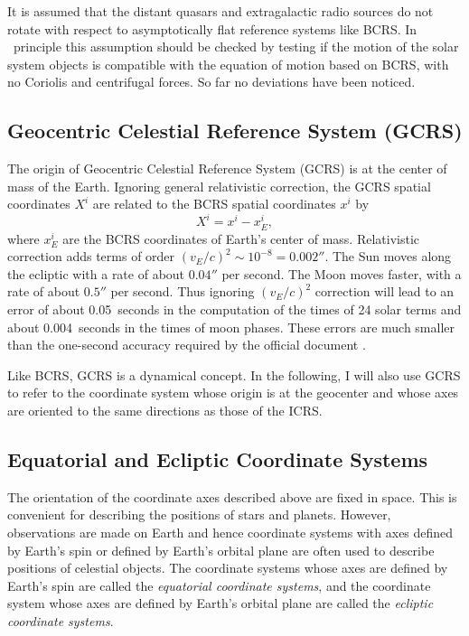 \documentclass[12pt]{article}
\newcommand \beq {\begin{equation}}
\newcommand \eeq {\end{equation}}
\begin{document}
\begin{CJK}{UTF8}{bkai}
It is assumed that the distant quasars and extragalactic radio sources do not 
rotate with respect to asymptotically flat reference systems like BCRS. In \
principle this assumption should be checked by testing if the motion of 
the solar system objects is compatible with the equation of motion based 
on BCRS, with no Coriolis and centrifugal forces. So far no deviations have been 
noticed. 

\subsection{Geocentric Celestial Reference System (GCRS)}

The origin of Geocentric Celestial Reference System (GCRS) is at the 
center of mass of the Earth. 
Ignoring general relativistic correction, the GCRS spatial coordinates $X^i$ 
are related to the BCRS spatial coordinates $x^i$ by 
\beq
  X^i = x^i - x^i_E ,
\label{eq:GCRSX}
\eeq
where $x^i_E$ are the BCRS coordinates of Earth's center of mass. Relativistic 
correction adds terms of order $(v_E/c)^2 \sim 10^{-8}=0.002''$. The Sun moves 
along the ecliptic with a rate of about $0.04''$ per second. The Moon moves 
faster, with a rate of about $0.5''$ per second. Thus ignoring $(v_E/c)^2$ 
correction will lead to an error of about 0.05~seconds in the computation of the 
times of 24 solar terms and about 0.004~seconds in the times of moon phases. 
These errors are much smaller than the one-second accuracy required by the 
official document \cite{pmo17}.

Like BCRS, GCRS is a dynamical concept. In the following, I will also use GCRS 
to refer to the coordinate system whose origin is at the geocenter and whose 
axes are oriented to the same directions as those of the ICRS.

\subsection{Equatorial and Ecliptic Coordinate Systems}

The orientation of the coordinate axes described above 
are fixed in space. This is convenient for describing the positions of
stars and planets. However, observations are made on Earth and hence 
coordinate systems with axes defined by Earth's spin or defined by Earth's orbital plane
are often used to describe positions of celestial objects. 
The coordinate systems whose axes are defined by Earth's spin are called 
the {\em equatorial coordinate systems}, and the coordinate system whose axes 
are defined by Earth's orbital plane are called the {\em ecliptic coordinate 
systems}.



\end{CJK}
\end{document}

